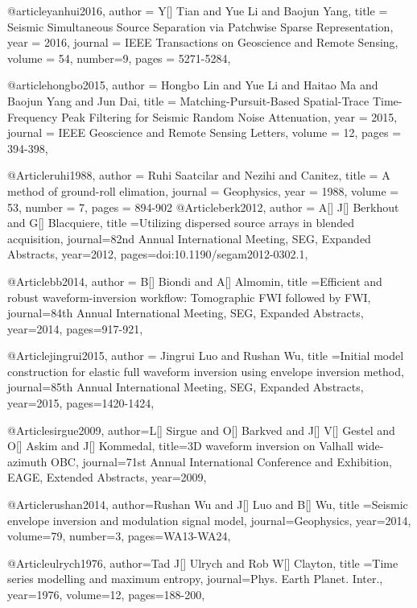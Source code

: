 @article{yanhui2016,
  author =	 {Y[] Tian and Yue Li and Baojun Yang},
  title =	 {Seismic Simultaneous Source Separation via Patchwise Sparse Representation},
  year =	 2016,
  journal =	 {IEEE Transactions on Geoscience and Remote Sensing},
  volume =	 54,
  number=9,
  pages =	 {5271-5284},
}

@article{hongbo2015,
  author =	 {Hongbo Lin and Yue Li and Haitao Ma and Baojun Yang and Jun Dai},
  title =	 {Matching-Pursuit-Based Spatial-Trace Time-Frequency Peak Filtering for Seismic Random Noise Attenuation},
  year =	 2015,
  journal =	 {IEEE Geoscience and Remote Sensing Letters},
  volume =	 12,
  pages =	 {394-398},
}

@Article{ruhi1988,
  author = 	 {Ruhi Saatcilar and Nezihi and Canitez},
  title = 	 {A method of ground-roll elimation},
  journal = 	 {Geophysics},
  year = 	 1988,
  volume = 	 53,
  number = 	 7,
  pages = 	 {894-902}}
@Article{berk2012,
  author = {A[] J[] Berkhout and G[] Blacquiere},
  title ={Utilizing dispersed source arrays in blended acquisition},
  journal={82nd Annual International Meeting, SEG, Expanded Abstracts},
  year=2012,
  pages={doi:10.1190/segam2012-0302.1},
}

@Article{bb2014,
  author = {B[] Biondi and A[] Almomin},
  title ={Efficient and robust waveform-inversion workflow: Tomographic FWI followed by FWI},
  journal={84th Annual International Meeting, SEG, Expanded Abstracts},
  year=2014,
  pages={917-921},
}

@Article{jingrui2015,
  author = {Jingrui Luo and Rushan Wu},
  title ={Initial model construction for elastic full waveform inversion using envelope inversion method},
  journal={85th Annual International Meeting, SEG, Expanded Abstracts},
  year=2015,
  pages={1420-1424},
}

@Article{sirgue2009,
  author={L[] Sirgue and O[] Barkved and J[] V[] Gestel and O[] Askim and J[] Kommedal},
  title={3D waveform inversion on Valhall wide-azimuth {OBC}},
  journal={71st Annual International Conference and Exhibition, EAGE, Extended Abstracts},
  year=2009,
}

@Article{rushan2014,
  author={Rushan Wu and J[] Luo and B[] Wu},
  title ={Seismic envelope inversion and modulation signal model},
  journal={Geophysics},
  year=2014,
  volume=79,
  number=3,
  pages={WA13-WA24},
}



@Article{ulrych1976,
  author={Tad J[] Ulrych and Rob W[] Clayton},
  title ={Time series modelling and maximum entropy},
  journal={Phys. Earth Planet. Inter.},
  year=1976,
  volume=12,
  pages={188-200},
}

